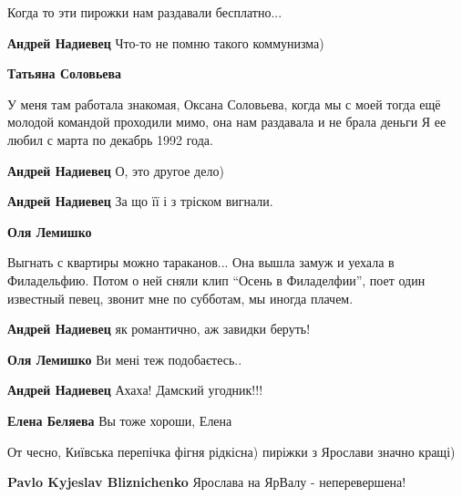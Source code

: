  
 
 
 
 
\zzSecCmt

\begin{itemize} %
Когда то эти пирожки нам раздавали бесплатно...

\begin{itemize} %
\textbf{Андрей Надиевец} Что-то не помню такого коммунизма)

\textbf{Татьяна Соловьева} 

У меня там работала знакомая, Оксана Соловьева, когда мы с моей тогда ещё
молодой командой проходили мимо, она нам раздавала и не брала деньги Я ее любил
с марта по декабрь 1992 года.


\textbf{Андрей Надиевец} О, это другое дело)

\textbf{Андрей Надиевец} За що її і з тріском вигнали.

\textbf{Оля Лемишко} 

Выгнать с квартиры можно тараканов... Она вышла замуж и уехала в Филадельфию.
Потом о ней сняли клип \enquote{Осень в Филаделфии}, поет один известный певец, звонит
мне по субботам, мы иногда плачем.


\textbf{Андрей Надиевец} як романтично, аж завидки беруть!

\textbf{Оля Лемишко} Ви мені теж подобаєтесь..

\textbf{Андрей Надиевец} Ахаха! Дамский угодник!!!

\textbf{Елена Беляева} Вы тоже хороши, Елена
\end{itemize} %


От чесно, Київська перепічка фігня рідкісна) пиріжки з Ярослави значно кращі)

\begin{itemize} %
\textbf{Pavlo Kyjeslav Bliznichenko} Ярослава на ЯрВалу - неперевершена!


\end{itemize}
\end{itemize}
